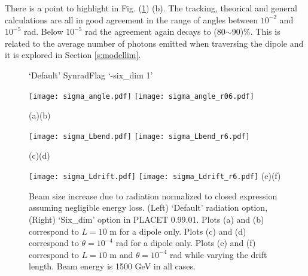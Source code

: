 There is a point to highlight in Fig. (\ref{figSR}) (b). The tracking, theorical and general calculations are all in good agreement in the range of angles between $10^{-2}$ and $10^{-5}$ rad. Below $10^{-5}$ rad the agreement again decays to (80$\sim$90)\%. This is related to the average number of photons emitted when traversing the dipole and it is explored in Section \ref{s:modellim}.\par
\begin{figure}[htb]
\centering
  \hspace*{1.2cm}`Default' Synrad\hspace*{5.0cm}Flag `-six\_dim 1'\par
 \texttt{[image: sigma\_angle.pdf]}
  \texttt{[image: sigma\_angle\_r06.pdf]}\par
  \hspace*{1.0cm}(a)\hspace*{7.6cm}(b)\par
   \texttt{[image: sigma\_Lbend.pdf]}
  \texttt{[image: sigma\_Lbend\_r6.pdf]}\par
  \hspace*{1.0cm}(c)\hspace*{7.6cm}(d)\par
  \texttt{[image: sigma\_Ldrift.pdf]}
  \texttt{[image: sigma\_Ldrift\_r6.pdf]}
  \hspace*{1.0cm}(e)\hspace*{7.6cm}(f)\par
\caption{Beam size increase due to radiation normalized to closed expression assuming negligible energy loss. (Left) `Default' radiation option, (Right) `Six\_dim' option in PLACET 0.99.01. Plots (a) and (b) correspond to $L=10$ m for a dipole only. Plots (c) and (d) correspond to $\theta=10^{-4}$ rad for a dipole only. Plots (e) and (f) correspond to $L=10$ m and $\theta=10^{-4}$ rad while varying the drift length. Beam energy is 1500 GeV in all cases.}\label{figSR}
\end{figure}
\clearpage
